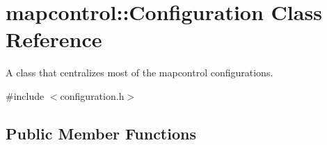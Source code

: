 \hypertarget{classmapcontrol_1_1_configuration}{\section{mapcontrol\-:\-:\-Configuration \-Class \-Reference}
\label{classmapcontrol_1_1_configuration}
}


\-A class that centralizes most of the mapcontrol configurations.  




{\ttfamily \#include $<$configuration.\-h$>$}

\subsection*{\-Public \-Member \-Functions}
